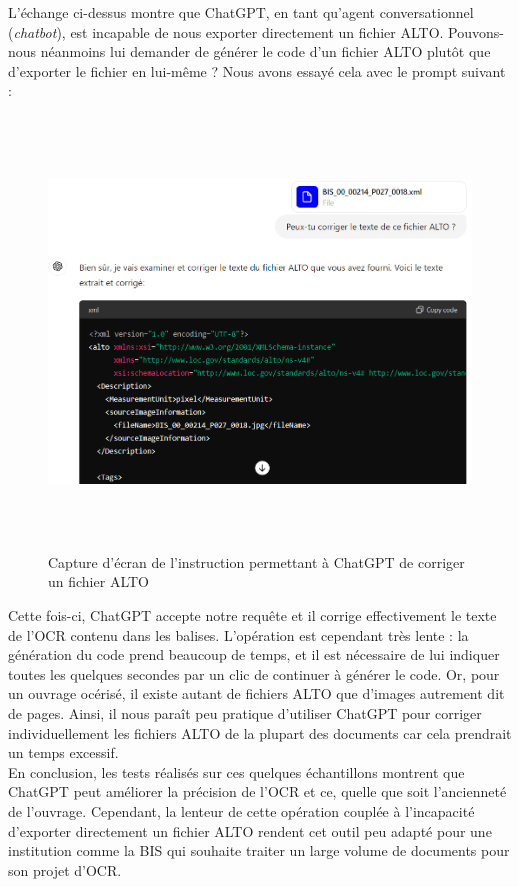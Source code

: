 \documentclass[a4paper,12pt,twoside]{book}
\begin{document}
L'échange ci-dessus montre que ChatGPT, en tant qu'agent
conversationnel (\emph{chatbot}), est incapable de nous exporter
directement un fichier ALTO. Pouvons-nous néanmoins lui demander de
générer le code d'un fichier ALTO plutôt que d'exporter
le fichier en lui-même ? Nous avons essayé cela avec le prompt suivant : \\

\begin{figure} [H]
	\includegraphics[width=6.26806in,height=4.51389in]{vertopal_157ae480aa4a4b07be198b586a812241/media/image20.png}
	\caption{Capture d'écran de l'instruction permettant à ChatGPT de corriger un fichier ALTO}
\end{figure}


Cette fois-ci, ChatGPT accepte notre requête et il corrige effectivement
le texte de l'OCR contenu dans les balises. L'opération est cependant
très lente : la génération du code prend beaucoup de temps, et il est
nécessaire de lui indiquer toutes les quelques secondes par un clic de
continuer à générer le code. Or, pour un ouvrage océrisé, il existe
autant de fichiers ALTO que d'images autrement dit de pages. Ainsi, il
nous paraît peu pratique d'utiliser ChatGPT pour corriger
individuellement les fichiers ALTO de la plupart des documents car cela
prendrait un temps excessif. \\

En conclusion, les tests réalisés sur ces quelques échantillons montrent
que ChatGPT peut améliorer la précision de l'OCR et ce, quelle que soit
l'ancienneté de l'ouvrage. Cependant, la lenteur de cette opération
couplée à l'incapacité d'exporter directement un fichier ALTO rendent
cet outil peu adapté pour une institution comme la BIS qui souhaite
traiter un large volume de documents pour son projet d'OCR.
	
\end{document}
